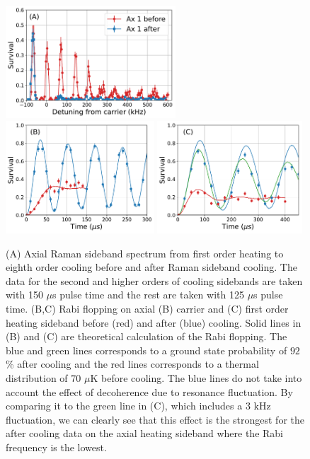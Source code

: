 \documentclass[aps,prl,twocolumn,groupedaddress]{revtex4-1}
\begin{document}
\begin{figure}
  \includegraphics[height=4.2cm]{imgs/spectrum_a1.pdf}
  \includegraphics[height=4.2cm]{imgs/rabi_flop_a1_0.pdf}
  \includegraphics[height=4.2cm]{imgs/rabi_flop_a1_p1.pdf}
  \caption{(A) Axial Raman sideband spectrum from first order heating to eighth order cooling
    before and after Raman sideband cooling.
    The data for the second and higher orders of cooling sidebands are taken with 150 $\mu$s
    pulse time and the rest are taken with 125 $\mu$s pulse time.
    (B,C) Rabi flopping on axial (B) carrier and (C) first order heating sideband
    before (red) and after (blue) cooling.
    Solid lines in (B) and (C) are theoretical calculation of the Rabi flopping.
    The blue and green lines corresponds to a ground state probability of $92$\% after cooling and
    the red lines corresponds to a thermal distribution of $70$ $\mu$K before cooling.
    The blue lines do not take into account the effect of decoherence due to resonance
    fluctuation. By comparing it to the green line in (C), which includes a $3$ kHz fluctuation,
    we can clearly see that this effect is the strongest for the after cooling data on
    the axial heating sideband where the Rabi frequency is the lowest.
    \label{f-axial}}
\end{figure}
\end{document}

